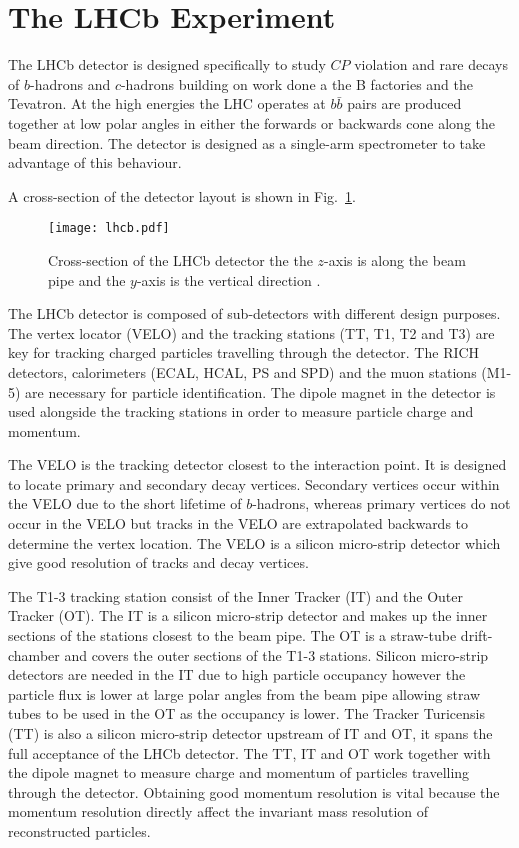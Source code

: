 

\section{The LHCb Experiment}
The LHCb detector is designed specifically to study $CP$ violation and rare decays of $b$-hadrons and $c$-hadrons building on work done a the B factories and the Tevatron.
At the high energies the LHC operates at $b\bar{b}$ pairs are produced together at low polar angles in either the forwards or backwards cone along the 
beam direction. The detector is designed as a single-arm spectrometer to take advantage of this behaviour.


A cross-section of the detector layout is shown in Fig.~\ref{LHCb}. 

\begin{figure}[htb]
\centering
  \texttt{[image: lhcb.pdf]}
  \caption{Cross-section of the LHCb detector the the $z$-axis is along the beam pipe and the $y$-axis is the vertical direction \cite{LHCb}.}
  \label{LHCb}
\end{figure}

The LHCb detector is composed of sub-detectors with different design purposes. The vertex locator (VELO) 
and the tracking stations (TT, T1, T2 and T3) are key for tracking charged particles travelling through
the detector. The RICH detectors, calorimeters (ECAL, HCAL, PS and SPD) and the muon stations (M1-5) 
are necessary for particle identification. The dipole magnet in the detector is used alongside the tracking stations in order to measure particle charge and momentum.


The VELO is the tracking detector closest to the interaction point. It is designed to locate primary and secondary decay vertices. Secondary vertices occur within the VELO
due to the short lifetime of $b$-hadrons, whereas primary vertices do not occur in the VELO but tracks in the VELO are extrapolated backwards to determine the vertex location.
The VELO is a silicon micro-strip detector which give good resolution of tracks and decay vertices. 




The T1-3 tracking station consist of the Inner Tracker (IT) and the Outer Tracker (OT). The IT is a silicon micro-strip detector and makes up the inner sections of the stations closest to the beam pipe.
The OT is a straw-tube drift-chamber and covers the outer sections of the T1-3 stations. Silicon micro-strip detectors are needed in the IT due to high particle occupancy however the particle flux is lower at large polar angles from the beam pipe allowing straw tubes to be used
in the OT as the occupancy is lower. The Tracker Turicensis (TT) is also a silicon micro-strip detector upstream of IT and OT, it spans the full acceptance of the LHCb detector. The TT, IT and OT work together with the dipole magnet to measure charge and momentum of particles travelling through the detector. Obtaining good momentum resolution is vital because the momentum resolution 
directly affect the invariant mass resolution of reconstructed particles. 

